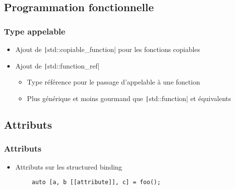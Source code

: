 \documentclass[C++.tex]{subfiles}
\begin{document}
\subsection*{Programmation fonctionnelle}
\begin{frame}[fragile]
	\frametitle{Type appelable}
	\begin{itemize}
		\item Ajout de \texttt|std::copiable_function| pour les fonctions copiables
		\item Ajout de \texttt|std::function_ref|
		\begin{itemize}
			\item Type référence pour le passage d'appelable à une fonction
			\item Plus générique et moins gourmand que \texttt|std::function| et équivalents

		\end{itemize}
	\end{itemize}

\end{frame}

\subsection*{Attributs}
\begin{frame}[fragile]
	\frametitle{Attributs}
	\begin{itemize}
		\item Attributs sur les structured binding
	\end{itemize}

	\begin{verbatim}
		auto [a, b [[attribute]], c] = foo();
	\end{verbatim}

\end{frame}
\end{document}
